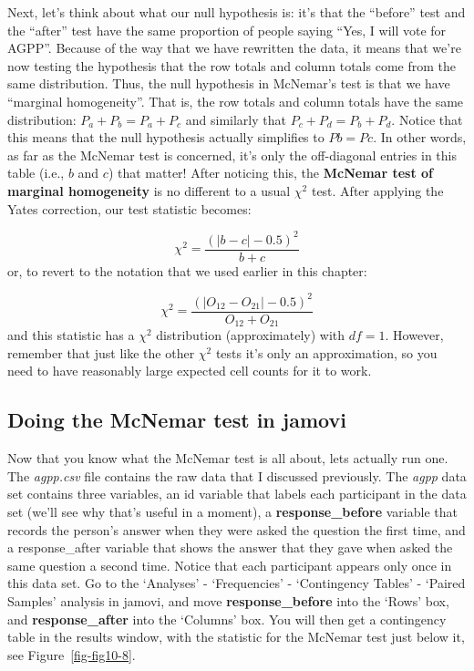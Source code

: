 \documentclass[
  a4paper,
]{book}
\begin{document}
Next, let's think about what our null hypothesis is: it's that the
``before'' test and the ``after'' test have the same proportion of
people saying ``Yes, I will vote for AGPP''. Because of the way that we
have rewritten the data, it means that we're now testing the hypothesis
that the row totals and column totals come from the same distribution.
Thus, the null hypothesis in McNemar's test is that we have ``marginal
homogeneity''. That is, the row totals and column totals have the same
distribution: \(P_a + P_b = P_a + P_c\) and similarly that
\(P_c + P_d = P_b + P_d\). Notice that this means that the null
hypothesis actually simplifies to \(Pb = Pc\). In other words, as far as
the McNemar test is concerned, it's only the off-diagonal entries in
this table (i.e., \(b\) and \(c\)) that matter! After noticing this, the
\textbf{McNemar test of marginal homogeneity} is no different to a usual
\(\chi^2\) test. After applying the Yates correction, our test statistic
becomes:

\[\chi^2=\frac{(|b-c|-0.5)^2}{b+c}\] or, to revert to the notation that
we used earlier in this chapter:

\[\chi^2=\frac{(|O_{12}-O_{21}|-0.5)^2}{O_{12}+O_{21}}\] and this
statistic has a \(\chi^2\) distribution (approximately) with \(df = 1\).
However, remember that just like the other \(\chi^2\) tests it's only an
approximation, so you need to have reasonably large expected cell counts
for it to work.

\hypertarget{doing-the-mcnemar-test-in-jamovi}{%
\subsection{Doing the McNemar test in
jamovi}\label{doing-the-mcnemar-test-in-jamovi}}

Now that you know what the McNemar test is all about, lets actually run
one. The \emph{agpp.csv} file contains the raw data that I discussed
previously. The \emph{agpp} data set contains three variables, an id
variable that labels each participant in the data set (we'll see why
that's useful in a moment), a \textbf{response\_before} variable that
records the person's answer when they were asked the question the first
time, and a response\_after variable that shows the answer that they
gave when asked the same question a second time. Notice that each
participant appears only once in this data set. Go to the `Analyses' -
`Frequencies' - `Contingency Tables' - `Paired Samples' analysis in
jamovi, and move \textbf{response\_before} into the `Rows' box, and
\textbf{response\_after} into the `Columns' box. You will then get a
contingency table in the results window, with the statistic for the
McNemar test just below it, see Figure~\ref{fig-fig10-8}.
\end{document}

